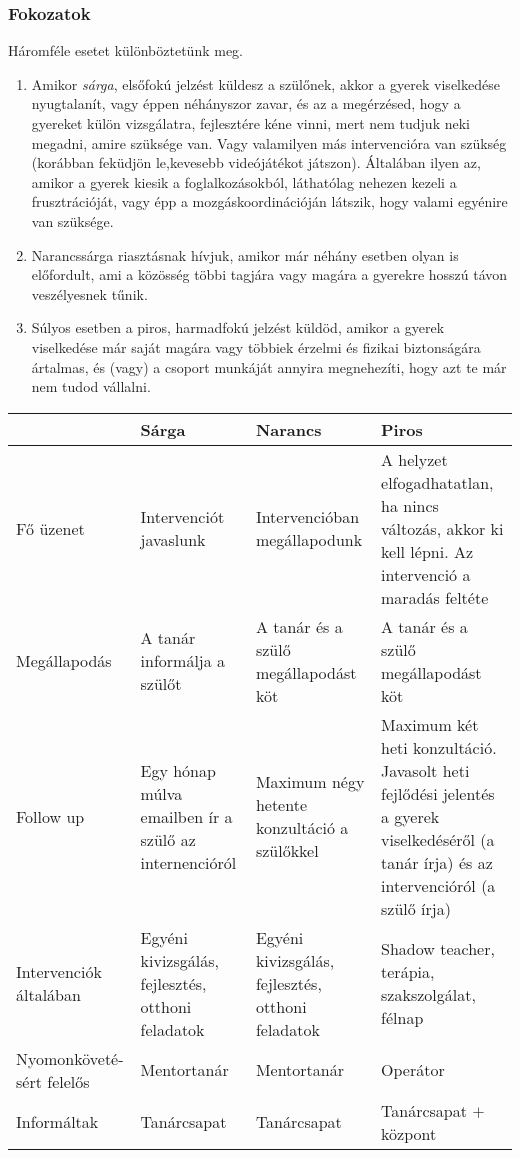 \hypertarget{fokozatok}{%
\subsubsection{Fokozatok}\label{fokozatok}}

Háromféle esetet különböztetünk meg.

\begin{enumerate}
\def\labelenumi{\arabic{enumi}.}
\tightlist
\item
  Amikor \emph{sárga}, elsőfokú jelzést küldesz a szülőnek, akkor a
  gyerek viselkedése nyugtalanít, vagy éppen néhányszor zavar, és az
  a megérzésed, hogy a gyereket külön vizsgálatra, fejlesztére kéne
  vinni, mert nem tudjuk neki megadni, amire szüksége van. Vagy
  valamilyen más intervencióra van szükség (korábban feküdjön
  le,kevesebb videójátékot játszon). Általában ilyen az, amikor a gyerek
  kiesik a foglalkozásokból, láthatólag nehezen kezeli a frusztrációját,
  vagy épp a mozgáskoordinációján látszik, hogy valami egyénire van
  szüksége.
\item
  Narancssárga riasztásnak hívjuk, amikor már néhány esetben olyan is
  előfordult, ami a közösség többi tagjára vagy magára a gyerekre hosszú távon
  veszélyesnek tűnik.
\item
  Súlyos esetben a piros, harmadfokú jelzést küldöd, amikor a gyerek
  viselkedése már saját magára vagy többiek érzelmi és fizikai biztonságára
  ártalmas, és (vagy) a csoport munkáját annyira megnehezíti, hogy azt te
  már nem tudod vállalni.
\end{enumerate}

\begin{longtable}[]{*{4}{>{\begin{minipage}[t]{.23\textwidth}\strut\raggedright}l<{\strut\end{minipage}}}}
\toprule
&\textbf{Sárga}&\textbf{Narancs}&\textbf{Piros}\tabularnewline
\midrule
\endhead
Fő üzenet
  &Intervenciót javaslunk
  &Intervencióban
   megállapodunk
  &A helyzet elfogadhatatlan, ha nincs változás, akkor ki kell lépni.  Az intervenció a maradás feltéte
\tabularnewline  
\midrule  
Megállapodás
  &A tanár informálja a szülőt
  &A tanár és a szülő megállapodást köt
  &A tanár és a szülő megállapodást köt
\tabularnewline
\midrule
Follow up
  &Egy hónap múlva emailben ír a szülő az internencióról
  &Maximum négy hetente konzultáció a szülőkkel
  &Maximum két heti konzultáció. Javasolt heti fejlődési jelentés a gyerek viselkedéséről (a tanár írja) és az intervencióról (a szülő írja)
\tabularnewline
\midrule
Intervenciók általában
  &Egyéni kivizsgálás, fejlesztés, otthoni feladatok
  &Egyéni kivizsgálás, fejlesztés, otthoni feladatok
  &Shadow teacher, terápia, szakszolgálat, félnap
\tabularnewline
\midrule
Nyomonköveté-\break
sért felelős
  &Mentortanár
  &Mentortanár
  &Operátor
\tabularnewline
\midrule
Informáltak
  &Tanárcsapat
  &Tanárcsapat
  &Tanárcsapat $+$ központ
\tabularnewline
\bottomrule
\end{longtable}




